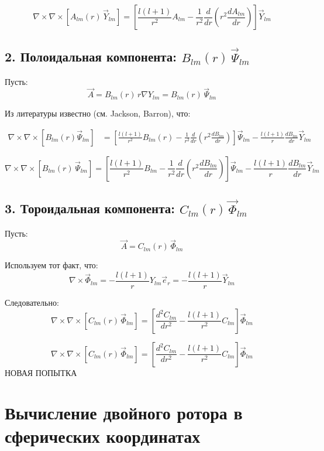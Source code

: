\documentclass{article}
\begin{document}
\[
\boxed{
\nabla \times \nabla \times \left[ A_{lm}(r)\, \vec{Y}_{lm} \right] =
\left[
\frac{l(l+1)}{r^2} A_{lm} - \frac{1}{r^2} \frac{d}{dr}(r^2 \frac{dA_{lm}}{dr})
\right] \vec{Y}_{lm}
}
\]

\subsection*{2. Полоидальная компонента: $B_{lm}(r)\, \vec{\Psi}_{lm}$}

Пусть:
\[
\vec{A} = B_{lm}(r)\, r \nabla Y_{lm} = B_{lm}(r)\, \vec{\Psi}_{lm}
\]

Из литературы известно (см. Jackson, Barron), что:

\begin{align*}
\nabla \times \nabla \times [B_{lm}(r) \vec{\Psi}_{lm}] &=
\left[
\frac{l(l+1)}{r^2} B_{lm}(r)
- \frac{1}{r^2} \frac{d}{dr}(r^2 \frac{d B_{lm}}{dr})
\right] \vec{\Psi}_{lm}
- \frac{l(l+1)}{r} \frac{d B_{lm}}{dr} \vec{Y}_{lm}
\end{align*}

\[
\boxed{
\nabla \times \nabla \times \left[ B_{lm}(r)\, \vec{\Psi}_{lm} \right] =
\left[
\frac{l(l+1)}{r^2} B_{lm} - \frac{1}{r^2} \frac{d}{dr}(r^2 \frac{dB_{lm}}{dr})
\right] \vec{\Psi}_{lm}
- \frac{l(l+1)}{r} \frac{d B_{lm}}{dr} \vec{Y}_{lm}
}
\]

\subsection*{3. Тороидальная компонента: $C_{lm}(r)\, \vec{\Phi}_{lm}$}

Пусть:
\[
\vec{A} = C_{lm}(r)\, \vec{\Phi}_{lm}
\]

Используем тот факт, что:
\[
\nabla \times \vec{\Phi}_{lm} = -\frac{l(l+1)}{r} Y_{lm} \vec{e}_r = -\frac{l(l+1)}{r} \vec{Y}_{lm}
\]

Следовательно:
\[
\nabla \times \nabla \times \left[ C_{lm}(r)\, \vec{\Phi}_{lm} \right] =
\left[
\frac{d^2 C_{lm}}{dr^2} - \frac{l(l+1)}{r^2} C_{lm}
\right] \vec{\Phi}_{lm}
\]

\[
\boxed{
\nabla \times \nabla \times \left[ C_{lm}(r)\, \vec{\Phi}_{lm} \right] =
\left[
\frac{d^2 C_{lm}}{dr^2} - \frac{l(l+1)}{r^2} C_{lm}
\right] \vec{\Phi}_{lm}
}
\]
НОВАЯ ПОПЫТКА


\section{Вычисление двойного ротора в сферических координатах}
\end{document}
